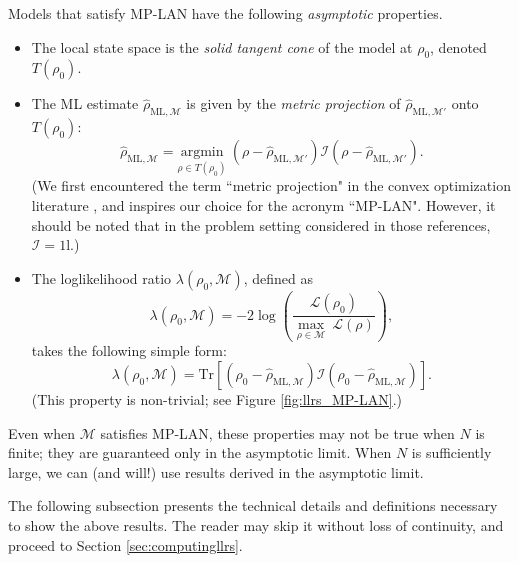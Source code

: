 \documentclass[aps,pra, twocolumn]{revtex4-1}
\newcommand{\M}{\mathcal{M}}
\newcommand{\cL}{\mathcal{L}}
\newcommand{\Id}{\mathbb{I}}
\def\Id{1\!\mathrm{l}}
\newcommand{\rhohat}{\hat{\rho}}
\newcommand{\rhoML}[1]{\rhohat_{\scriptscriptstyle{\mathrm{ML},#1}}}
\begin{document}
Models that satisfy MP-LAN have the following \emph{asymptotic} properties.
\begin{itemize}[nosep]
\item The local state space is the \emph{solid tangent cone} of the model at $\rho_{0}$, denoted $T(\rho_{0})$.
\item The ML estimate $\rhoML{\M}$ is given by the \emph{metric projection} of $\rhoML{\M'}$ onto $T(\rho_{0})$:
\begin{equation}
\label{eq:MP-LANmle}
\rhoML{\M} = \underset{\rho \in T(\rho_{0})}{\text{argmin}}~(\rho  -\rhoML{\M'})\mathcal{I}(\rho  -\rhoML{\M'}).
\end{equation}
(We first encountered the term ``metric projection" in the convex optimization literature \cite{McCoy2014, Amelunxen2014}, and inspires our choice for the acronym ``MP-LAN". However, it should be noted that in the problem setting considered in those references, $\mathcal{I} = \Id$.)

\item The loglikelihood ratio $\lambda(\rho_{0}, \M)$, defined as
\begin{equation}
\label{eq:llrs_lan_2}
\lambda(\rho_{0}, \M) = -2 \log \left(\frac{\cL(\rho_{0})}{\underset{\rho \in \M}{\max}~\cL(\rho)}\right),
\end{equation}
takes the following simple form:
\begin{equation}
\label{eq:llrs_lan}
\lambda(\rho_{0}, \M) =  \mathrm{Tr}[(\rho_{0} - \rhoML{\M})\mathcal{I}(\rho_{0} - \rhoML{\M})].
\end{equation}
(This property is non-trivial; see Figure \ref{fig:llrs_MP-LAN}.)
\end{itemize}



Even when $\M$ satisfies MP-LAN, these properties may not be true when $N$ is finite; they are guaranteed only in the asymptotic limit. When $N$ is sufficiently large, we can (and will!) use results derived in the asymptotic limit.

The following subsection presents the technical details and definitions necessary to show the above results. The reader may skip it without loss of continuity, and proceed to Section \ref{sec:computingllrs}.
\end{document}
